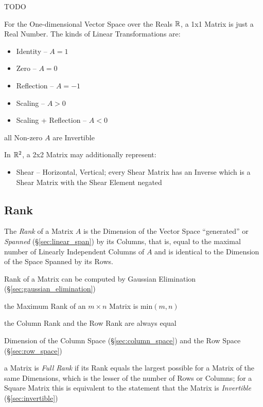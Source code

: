 TODO

For the One-dimensional Vector Space over the Reals $\mathbb{R}$, a 1x1 Matrix is
just a Real Number. The kinds of Linear Transformations are:
\begin{itemize}
  \item Identity -- $A = 1$
  \item Zero -- $A = 0$
  \item Reflection -- $A = -1$
  \item Scaling -- $A > 0$
  \item Scaling + Reflection -- $A < 0$
\end{itemize}
all Non-zero $A$ are Invertible

In $\mathbb{R}^2$, a 2x2 Matrix may additionally represent:
\begin{itemize}
  \item Shear -- Horizontal, Vertical; every Shear Matrix has an Inverse which
    is a Shear Matrix with the Shear Element negated
\end{itemize}



\subsection{Rank}\label{sec:rank}

The \emph{Rank} of a Matrix $A$ is the Dimension of the Vector Space
``generated'' or \emph{Spanned} (\S\ref{sec:linear_span}) by its Columns, that
is, equal to the maximal number of Linearly Independent Columns of $A$ and is
identical to the Dimension of the Space Spanned by its Rows.

\fist Rank of a Matrix can be computed by Gaussian Elimination
(\S\ref{sec:gaussian_elimination})

the Maximum Rank of an $m \times n$ Matrix is $\mathrm{min}(m,n)$

the Column Rank and the Row Rank are always equal

Dimension of the Column Space (\S\ref{sec:column_space}) and the Row Space
(\S\ref{sec:row_space})

a Matrix is \emph{Full Rank} if its Rank equals the largest possible for a
Matrix of the same Dimensions, which is the lesser of the number of Rows or
Columns; for a Square Matrix this is equivalent to the statement that the
Matrix is \emph{Invertible} (\S\ref{sec:invertible})

